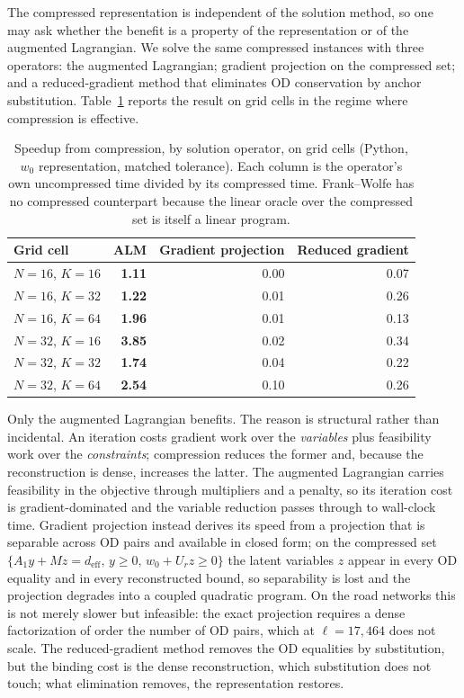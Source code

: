 \documentclass[11pt]{article}
\begin{document}
The compressed representation is independent of the solution method, so one may ask whether
the benefit is a property of the representation or of the augmented Lagrangian. We solve the
same compressed instances with three operators: the augmented Lagrangian; gradient projection
on the compressed set; and a reduced-gradient method that eliminates OD conservation by
anchor substitution. Table~\ref{tab:operator-compression} reports the result on grid cells in
the regime where compression is effective.

\begin{table}[h]
\centering
\caption{Speedup from compression, by solution operator, on grid cells
(Python, $w_0$ representation, matched tolerance). Each column is the operator's own
uncompressed time divided by its compressed time. Frank--Wolfe has no compressed counterpart
because the linear oracle over the compressed set is itself a linear program.}
\label{tab:operator-compression}
{\small
\begin{tabular}{lrrr}
\toprule
Grid cell & ALM & Gradient projection & Reduced gradient\\
\midrule
$N=16$, $K=16$ & \textbf{1.11} & 0.00 & 0.07\\
$N=16$, $K=32$ & \textbf{1.22} & 0.01 & 0.26\\
$N=16$, $K=64$ & \textbf{1.96} & 0.01 & 0.13\\
$N=32$, $K=16$ & \textbf{3.85} & 0.02 & 0.34\\
$N=32$, $K=32$ & \textbf{1.74} & 0.04 & 0.22\\
$N=32$, $K=64$ & \textbf{2.54} & 0.10 & 0.26\\
\bottomrule
\end{tabular}}
\end{table}

Only the augmented Lagrangian benefits. The reason is structural rather than incidental. An
iteration costs gradient work over the \emph{variables} plus feasibility work over the
\emph{constraints}; compression reduces the former and, because the reconstruction is dense,
increases the latter. The augmented Lagrangian carries feasibility in the objective through
multipliers and a penalty, so its iteration cost is gradient-dominated and the variable
reduction passes through to wall-clock time. Gradient projection instead derives its speed
from a projection that is separable across OD pairs and available in closed form; on the
compressed set $\{A_1y+Mz=d_{\mathrm{eff}},\,y\ge0,\,w_0+U_rz\ge0\}$ the latent variables
$z$ appear in every OD equality and in every reconstructed bound, so separability is lost and
the projection degrades into a coupled quadratic program. On the road networks this is not
merely slower but infeasible: the exact projection requires a dense factorization of order
the number of OD pairs, which at $\ell=17{,}464$ does not scale. The reduced-gradient method
removes the OD equalities by substitution, but the binding cost is the dense reconstruction,
which substitution does not touch; what elimination removes, the representation restores.
\end{document}
